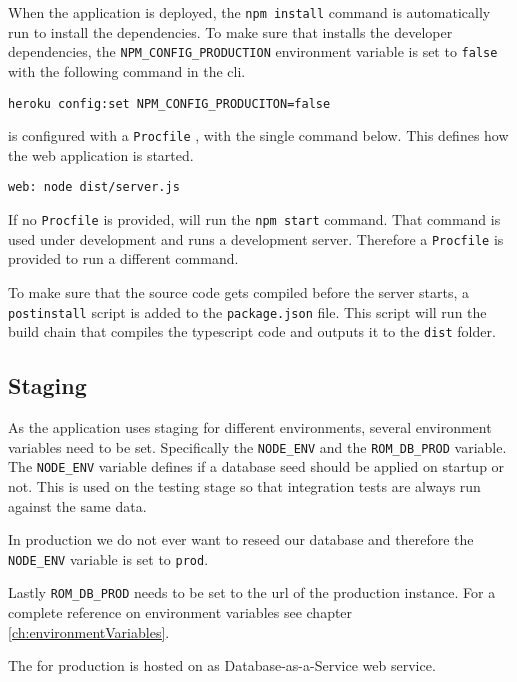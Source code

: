When the application is deployed, the \verb+npm install+ command is automatically run to install the dependencies.
To make sure that  installs the developer dependencies, the \verb+NPM_CONFIG_PRODUCTION+ environment variable is set to \verb+false+ with the following command in the  \gls{cli}.

\verb+heroku config:set NPM_CONFIG_PRODUCITON=false+

 is configured with a \verb+Procfile+ \citep{documentation:deployment:heroku:procfile}, with the single command below. This defines how the web application is started.

\verb+web: node dist/server.js+

If no \verb+Procfile+ is provided,  will run the \verb+npm start+ command.
That command is used under development and runs a development server.
Therefore a \verb+Procfile+ is provided to run a different command.

To make sure that the source code gets compiled before the server starts, a \verb+postinstall+ script is added to the \verb+package.json+ file.
This script will run the  build chain that compiles the \gls{typescript} code and outputs it to the \verb+dist+ folder.

\subsection{Staging}
\label{sec:staging}
As the application uses staging for different environments, several environment variables need to be set.
Specifically the \verb+NODE_ENV+ and the \verb+ROM_DB_PROD+ variable. 
The \verb+NODE_ENV+ variable defines if a database seed should be applied on startup or not. 
This is used on the testing stage so that integration tests are always run against the same data.

In production we do not ever want to reseed our database and therefore the \verb+NODE_ENV+ variable is set to \verb+prod+.

Lastly \verb+ROM_DB_PROD+ needs to be set to the \gls{url} of the production  instance.
For a complete reference on environment variables see chapter \ref{ch:environmentVariables}.

The  for production is hosted on  as Database-as-a-Service web service.
